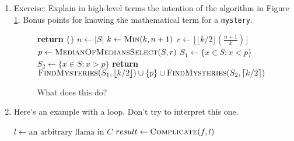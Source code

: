 \documentclass[letterpaper]{article}
\begin{document}
\begin{enumerate}

  \item
  Exercise: Explain in high-level terms the intention of the algorithm in Figure \ref{code:mystery}. Bonus points for knowing the mathematical term for a \texttt{mystery}.

  \begin{figure}
    \caption{What does this do?}

    \label{code:mystery}

    \begin{algorithmic}[1]
          \State \textbf{return} $\{\}$ 
        \EndIf
        \State $n \gets |S|$ 
        \State $k \gets \Call{Min}{k, n + 1}$ 
        \State $r\gets \lfloor \lfloor k/2 \rfloor (\tfrac{n+1}{k}) \rfloor$ 
        \State $p \gets \Call{MedianOfMediansSelect}{S, r}$ 
        \State $S_1 \gets \{ x \in S : x < p \}$
        \State $S_2 \gets \{ x \in S : x > p \}$
        \State \textbf{return} $\Call{FindMysteries}{S_1, \lfloor k/2 \rfloor} \cup\{ p \} \cup \Call{FindMysteries}{S_2, \lceil k/2 \rceil}$
      \EndFunction
    \end{algorithmic}

  \end{figure}

  \item
  Here's an example with a loop. Don't try to interpret this one.

  \begin{algorithmic}
        \State $l \gets \text{an arbitrary llama in $C$}$
        \State {}
        \State $result \gets \Call{Complicate}{f, l}$
          \State {}
        \EndIf
      \EndFor
    \EndFunction
  \end{algorithmic}

\end{enumerate}
\end{document}
